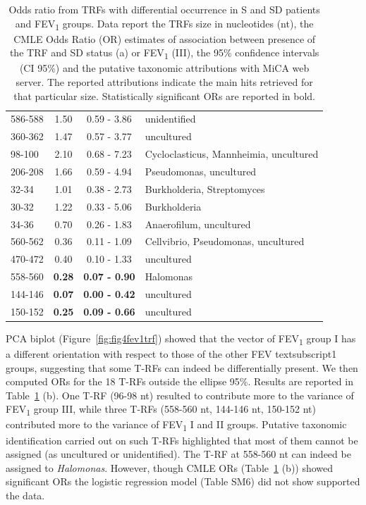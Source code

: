 \begin{table}
\begin{tabular}{l c c l}
586-588 & 1.50 & 0.59 - 3.86 & unidentified \\
360-362 & 1.47 & 0.57 - 3.77 & uncultured \\
98-100 & 2.10 & 0.68 - 7.23 & Cycloclasticus, Mannheimia, uncultured \\
206-208 & 1.66 & 0.59 - 4.94 & Pseudomonas, uncultured \\
32-34 & 1.01 & 0.38 - 2.73 & Burkholderia, Streptomyces \\
30-32 & 1.22 & 0.33 - 5.06 & Burkholderia \\
34-36 & 0.70 & 0.26 - 1.83 & Anaerofilum, uncultured \\
560-562 & 0.36 & 0.11 - 1.09 & Cellvibrio, Pseudomonas, uncultured \\
470-472 & 0.40 & 0.10 - 1.33 & uncultured \\
558-560 & \textbf{0.28} & \textbf{0.07 - 0.90} & Halomonas \\
144-146 & \textbf{0.07} & \textbf{0.00 - 0.42} & uncultured \\
150-152 & \textbf{0.25} & \textbf{0.09 - 0.66} & uncultured \\
\hline
\end{tabular}
\caption{\label{tab:ordettrflp} Odds ratio from TRFs with differential occurrence in S and SD patients and FEV\textsubscript{1} groups. Data report the TRFs size in nucleotides (nt), the CMLE Odds Ratio (OR) estimates of association between presence of the TRF and SD status (a) or FEV\textsubscript{1} (III), the 95\% confidence intervals (CI 95\%) and the putative taxonomic attributions with MiCA web server. The reported attributions indicate the main hits retrieved for that particular size. Statistically significant ORs are reported in bold.} 
\end{table}
PCA biplot (Figure~\ref{fig:fig4fev1trf}) showed that the vector of FEV\textsubscript{1} group I has a different orientation with respect to those of the other FEV textsubscript{1} groups, suggesting that some T-RFs can indeed be differentially present. We then computed ORs for the 18 T-RFs outside the ellipse 95\%. Results are reported in Table~\ref{tab:ordettrflp} (b). One T-RF (96-98 nt) resulted to contribute more to the variance of FEV\textsubscript{1} group III, while three T-RFs (558-560 nt, 144-146 nt, 150-152 nt) contributed more to the variance of FEV\textsubscript{1} I and II groups. Putative taxonomic identification carried out on such T-RFs highlighted that most of them cannot be assigned (as uncultured or unidentified). The T-RF at 558-560 nt can indeed be assigned to \textit{Halomonas}. However, though CMLE ORs (Table~\ref{tab:ordettrflp} (b)) showed significant ORs the logistic regression model (Table SM6) did not show supported the data.\\%
